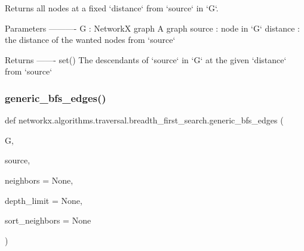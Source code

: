 \begin{DoxyVerb}Returns all nodes at a fixed `distance` from `source` in `G`.

Parameters
----------
G : NetworkX graph
    A graph
source : node in `G`
distance : the distance of the wanted nodes from `source`

Returns
-------
set()
    The descendants of `source` in `G` at the given `distance` from `source`
\end{DoxyVerb}
 \mbox{\label{namespacenetworkx_1_1algorithms_1_1traversal_1_1breadth__first__search_a548d3ed070b97572b2ea3c4b88b2488d}} 
\subsubsection{\texorpdfstring{generic\+\_\+bfs\+\_\+edges()}{generic\_bfs\_edges()}}
{\footnotesize\ttfamily def networkx.\+algorithms.\+traversal.\+breadth\+\_\+first\+\_\+search.\+generic\+\_\+bfs\+\_\+edges (\begin{DoxyParamCaption}\item[{}]{G,  }\item[{}]{source,  }\item[{}]{neighbors = {\ttfamily None},  }\item[{}]{depth\+\_\+limit = {\ttfamily None},  }\item[{}]{sort\+\_\+neighbors = {\ttfamily None} }\end{DoxyParamCaption})}

